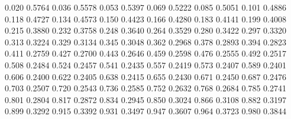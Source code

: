 0.020 0.5764
0.036 0.5578
0.053 0.5397
0.069 0.5222
0.085 0.5051
0.101 0.4886
0.118 0.4727
0.134 0.4573
0.150 0.4423
0.166 0.4280
0.183 0.4141
0.199 0.4008
0.215 0.3880
0.232 0.3758
0.248 0.3640
0.264 0.3529
0.280 0.3422
0.297 0.3320
0.313 0.3224
0.329 0.3134
0.345 0.3048
0.362 0.2968
0.378 0.2893
0.394 0.2823
0.411 0.2759
0.427 0.2700
0.443 0.2646
0.459 0.2598
0.476 0.2555
0.492 0.2517
0.508 0.2484
0.524 0.2457
0.541 0.2435
0.557 0.2419
0.573 0.2407
0.589 0.2401
0.606 0.2400
0.622 0.2405
0.638 0.2415
0.655 0.2430
0.671 0.2450
0.687 0.2476
0.703 0.2507
0.720 0.2543
0.736 0.2585
0.752 0.2632
0.768 0.2684
0.785 0.2741
0.801 0.2804
0.817 0.2872
0.834 0.2945
0.850 0.3024
0.866 0.3108
0.882 0.3197
0.899 0.3292
0.915 0.3392
0.931 0.3497
0.947 0.3607
0.964 0.3723
0.980 0.3844
